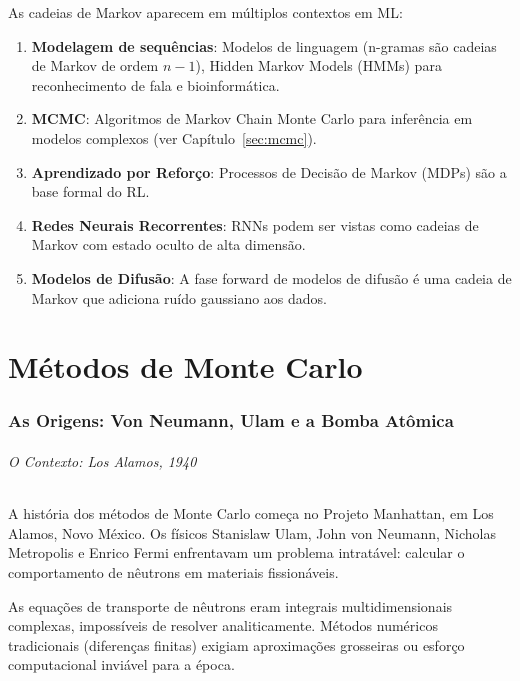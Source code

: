 \documentclass{tufte-handout}
\begin{document}
As cadeias de Markov aparecem em múltiplos contextos em ML:

\begin{enumerate}
    \item \textbf{Modelagem de sequências}: Modelos de linguagem (n-gramas são cadeias de
    Markov de ordem $n-1$), Hidden Markov Models (HMMs) para reconhecimento de fala e
    bioinformática.
    \item \textbf{MCMC}: Algoritmos de Markov Chain Monte Carlo para inferência em modelos
    complexos (ver Capítulo~\ref{sec:mcmc}).
    \item \textbf{Aprendizado por Reforço}: Processos de Decisão de Markov (MDPs) são a
    base formal do RL.
    \item \textbf{Redes Neurais Recorrentes}: RNNs podem ser vistas como cadeias de Markov
    com estado oculto de alta dimensão.
    \item \textbf{Modelos de Difusão}: A fase forward de modelos de difusão é uma cadeia
    de Markov que adiciona ruído gaussiano aos dados.
\end{enumerate}


\part{Métodos de Monte Carlo}

\section{As Origens: Von Neumann, Ulam e a Bomba Atômica}

\paragraph{O Contexto: Los Alamos, 1940}

A história dos métodos de Monte Carlo começa no Projeto Manhattan, em Los Alamos,
Novo México. Os físicos Stanislaw Ulam, John von Neumann, Nicholas Metropolis e
Enrico Fermi enfrentavam um problema intratável: calcular o comportamento de nêutrons
em materiais fissionáveis.

As equações de transporte de nêutrons eram integrais multidimensionais complexas,
impossíveis de resolver analiticamente. Métodos numéricos tradicionais (diferenças finitas)
exigiam aproximações grosseiras ou esforço computacional inviável para a época.
\end{document}
